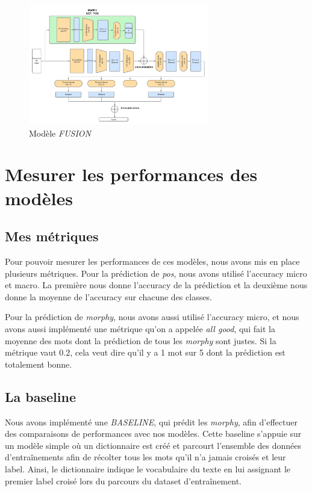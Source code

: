 \documentclass[a4paper]{article}
\begin{document}
\begin{figure}[H]
    \centering
    \includegraphics[width=0.7\textwidth]{get_morphy_fusion.png}
    \caption{Modèle \textit{FUSION}}
    \label{fig: model fusion}
\end{figure}


\section{Mesurer les performances des modèles}

\subsection{Mes métriques}

Pour pouvoir mesurer les performances de ces modèles, nous avons mis en place plusieurs métriques. Pour la prédiction de 
\textit{pos}, nous avons utilisé l'accuracy micro et macro. La première nous donne l'accuracy de la prédiction et la deuxième
nous donne la moyenne de l'accuracy sur chacune des classes. 

Pour la prédiction de \textit{morphy}, nous avons aussi utilisé l'accuracy micro, et nous avons aussi implémenté une 
métrique qu'on a appelée \textit{all good}, qui fait la moyenne des mots dont la prédiction de tous les \textit{morphy}
sont justes. Si la métrique vaut $0.2$, cela veut dire qu'il y a 1 mot sur 5 dont la prédiction est totalement bonne.

\subsection{La baseline}

Nous avons implémenté une \textit{BASELINE}, qui prédit les \textit{morphy}, afin d'effectuer des comparaisons de performances avec nos modèles.
Cette baseline s'appuie sur un modèle simple où un dictionnaire est créé et parcourt l'ensemble des données d'entraînements afin de 
récolter tous les mots qu'il n'a jamais croisés et leur label. Ainsi, le dictionnaire indique le vocabulaire du texte en lui assignant
le premier label croisé lors du parcours du dataset d'entraînement.
\end{document}
